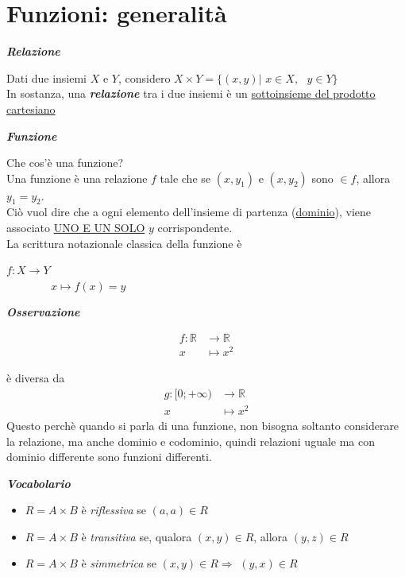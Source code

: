 \documentclass{article}
\theoremstyle{definition}
\begin{document}
\section{Funzioni: generalità}
\begin{center}
    \textbf{\textit{Relazione}}
\end{center}
Dati due insiemi $X$ e $Y$, considero $X\times Y = \{(x,y) | \,\, x \in X, \,\,\,\, y \in Y\}$
\\
In sostanza, una \textbf{\textit{relazione}} tra i due insiemi è un \underline{sottoinsieme del prodotto cartesiano}
\\
\begin{center}
    \textbf{\textit{Funzione}}
\end{center}
Che cos'è una funzione?
\\
Una funzione è una relazione $f$ tale che se $(x,y_1)$ e $(x, y_2)$ sono $\in f$, allora $y_1=y_2$.
\\ Ciò vuol dire che a ogni elemento dell'insieme di partenza (\underline{dominio}), viene associato \underline{UNO E UN SOLO} $y$ corrispondente.
\\
La scrittura notazionale classica della funzione è
\begin{center}
   $ f: X \rightarrow Y$
    \\
    \,\,\,\,\, \,\,\,\,\,\,\,\,\,\,\,\,\,\,\,\,\,\small{$x \mapsto f(x)=y$}
\end{center}
\begin{center}
    \textbf{\textit{Osservazione}}
\end{center}
\begin{align*}
f \colon \mathbb{R} &\to \mathbb{R} \\
x &\mapsto x^2
\end{align*}

è diversa da \begin{align*}
g \colon [0;+\infty) &\to \mathbb{R} \\
x &\mapsto x^2
\end{align*}
Questo perchè quando si parla di una funzione, non bisogna soltanto considerare la relazione, ma anche dominio e codominio, quindi relazioni uguale ma con dominio differente sono funzioni differenti.
\begin{center}
    \textbf{\textit{Vocabolario}}
\end{center}
\begin{itemize}
    \item $R=A \times B$ è \textit{riflessiva} se $(a,a) \in R$
    \item  $R=A \times B$ è \textit{transitiva} se, qualora $(x,y) \in R$, allora $(y,z) \in R$
    \item $R=A \times B$ è \textit{simmetrica} se $(x,y) \in R \Longrightarrow$ $(y,x) \in R$
\end{itemize}
\end{document}
